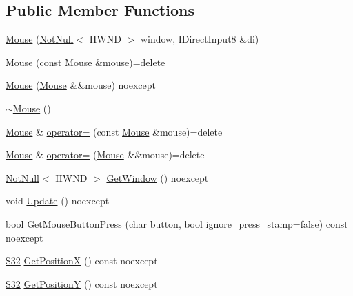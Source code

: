 \subsection*{Public Member Functions}
\begin{DoxyCompactItemize}
\item 
\mbox{\hyperlink{classmage_1_1input_1_1_mouse_add3fd231e5af4f3669eaa8d5f8d157ec}{Mouse}} (\mbox{\hyperlink{namespacemage_a8769f9d670d6b585ea306cb1062af94b}{Not\+Null}}$<$ H\+W\+ND $>$ window, I\+Direct\+Input8 \&di)
\item 
\mbox{\hyperlink{classmage_1_1input_1_1_mouse_a4f560bb3a59f6cee57e7cd03b24ef218}{Mouse}} (const \mbox{\hyperlink{classmage_1_1input_1_1_mouse}{Mouse}} \&mouse)=delete
\item 
\mbox{\hyperlink{classmage_1_1input_1_1_mouse_a6e8185b9b2f0fdcd63a191389eb2b050}{Mouse}} (\mbox{\hyperlink{classmage_1_1input_1_1_mouse}{Mouse}} \&\&mouse) noexcept
\item 
\mbox{\hyperlink{classmage_1_1input_1_1_mouse_abfc6391c896b029e38ffa1341dcf9963}{$\sim$\+Mouse}} ()
\item 
\mbox{\hyperlink{classmage_1_1input_1_1_mouse}{Mouse}} \& \mbox{\hyperlink{classmage_1_1input_1_1_mouse_af4ce64a7808af28c80bc9c01c83f7d14}{operator=}} (const \mbox{\hyperlink{classmage_1_1input_1_1_mouse}{Mouse}} \&mouse)=delete
\item 
\mbox{\hyperlink{classmage_1_1input_1_1_mouse}{Mouse}} \& \mbox{\hyperlink{classmage_1_1input_1_1_mouse_a05d2471a4f517cc1970df352e7a68724}{operator=}} (\mbox{\hyperlink{classmage_1_1input_1_1_mouse}{Mouse}} \&\&mouse)=delete
\item 
\mbox{\hyperlink{namespacemage_a8769f9d670d6b585ea306cb1062af94b}{Not\+Null}}$<$ H\+W\+ND $>$ \mbox{\hyperlink{classmage_1_1input_1_1_mouse_a5fd893af2aede58106b718448e7e0dde}{Get\+Window}} () noexcept
\item 
void \mbox{\hyperlink{classmage_1_1input_1_1_mouse_aa4eb9865206c2b946f8d21106d378907}{Update}} () noexcept
\item 
bool \mbox{\hyperlink{classmage_1_1input_1_1_mouse_a1aed699ffd28b121e9da426113937f85}{Get\+Mouse\+Button\+Press}} (char button, bool ignore\+\_\+press\+\_\+stamp=false) const noexcept
\item 
\mbox{\hyperlink{namespacemage_a642e05c5c83642b6946703615cdbf2da}{S32}} \mbox{\hyperlink{classmage_1_1input_1_1_mouse_a208f26babea7ac6e07af5f79600e22ae}{Get\+PositionX}} () const noexcept
\item 
\mbox{\hyperlink{namespacemage_a642e05c5c83642b6946703615cdbf2da}{S32}} \mbox{\hyperlink{classmage_1_1input_1_1_mouse_a81bf0ebd5fb34a25ba9f5d4c7aea1ed6}{Get\+PositionY}} () const noexcept

\end{DoxyCompactItemize}
